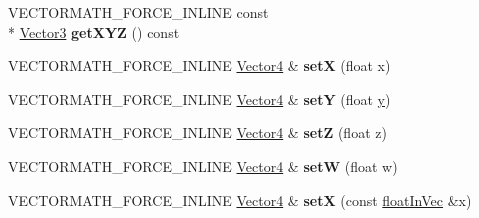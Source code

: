 \begin{DoxyCompactItemize}
\item 
\hypertarget{class_vectormath_1_1_aos_1_1_vector4_a79139c319b533238711f2338a1979717}{V\+E\+C\+T\+O\+R\+M\+A\+T\+H\+\_\+\+F\+O\+R\+C\+E\+\_\+\+I\+N\+L\+I\+N\+E const \\*
\hyperlink{class_vectormath_1_1_aos_1_1_vector3}{Vector3} {\bfseries get\+X\+Y\+Z} () const }\label{class_vectormath_1_1_aos_1_1_vector4_a79139c319b533238711f2338a1979717}

\item 
\hypertarget{class_vectormath_1_1_aos_1_1_vector4_a3b1066106df5011f068f45f9d81aa78e}{V\+E\+C\+T\+O\+R\+M\+A\+T\+H\+\_\+\+F\+O\+R\+C\+E\+\_\+\+I\+N\+L\+I\+N\+E \hyperlink{class_vectormath_1_1_aos_1_1_vector4}{Vector4} \& {\bfseries set\+X} (float x)}\label{class_vectormath_1_1_aos_1_1_vector4_a3b1066106df5011f068f45f9d81aa78e}

\item 
\hypertarget{class_vectormath_1_1_aos_1_1_vector4_ad0e117a9abe04f1239a61b084c61a731}{V\+E\+C\+T\+O\+R\+M\+A\+T\+H\+\_\+\+F\+O\+R\+C\+E\+\_\+\+I\+N\+L\+I\+N\+E \hyperlink{class_vectormath_1_1_aos_1_1_vector4}{Vector4} \& {\bfseries set\+Y} (float \hyperlink{_ice_utils_8h_aa7ffaed69623192258fb8679569ff9ba}{y})}\label{class_vectormath_1_1_aos_1_1_vector4_ad0e117a9abe04f1239a61b084c61a731}

\item 
\hypertarget{class_vectormath_1_1_aos_1_1_vector4_ae0240167e06311cc56c68906a2c30f1f}{V\+E\+C\+T\+O\+R\+M\+A\+T\+H\+\_\+\+F\+O\+R\+C\+E\+\_\+\+I\+N\+L\+I\+N\+E \hyperlink{class_vectormath_1_1_aos_1_1_vector4}{Vector4} \& {\bfseries set\+Z} (float z)}\label{class_vectormath_1_1_aos_1_1_vector4_ae0240167e06311cc56c68906a2c30f1f}

\item 
\hypertarget{class_vectormath_1_1_aos_1_1_vector4_af8ab35a1875d77ba0a514dc2c326c925}{V\+E\+C\+T\+O\+R\+M\+A\+T\+H\+\_\+\+F\+O\+R\+C\+E\+\_\+\+I\+N\+L\+I\+N\+E \hyperlink{class_vectormath_1_1_aos_1_1_vector4}{Vector4} \& {\bfseries set\+W} (float w)}\label{class_vectormath_1_1_aos_1_1_vector4_af8ab35a1875d77ba0a514dc2c326c925}

\item 
\hypertarget{class_vectormath_1_1_aos_1_1_vector4_af8ff7dda5664aee5d753afc2f1e36d15}{V\+E\+C\+T\+O\+R\+M\+A\+T\+H\+\_\+\+F\+O\+R\+C\+E\+\_\+\+I\+N\+L\+I\+N\+E \hyperlink{class_vectormath_1_1_aos_1_1_vector4}{Vector4} \& {\bfseries set\+X} (const \hyperlink{class_vectormath_1_1float_in_vec}{float\+In\+Vec} \&x)}\label{class_vectormath_1_1_aos_1_1_vector4_af8ff7dda5664aee5d753afc2f1e36d15}


\end{DoxyCompactItemize}
